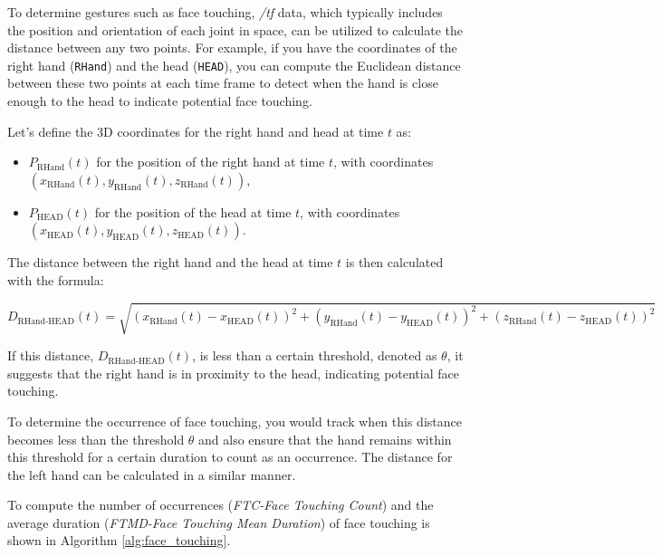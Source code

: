 To determine gestures such as face touching, \textit{/tf} data, which typically includes the position and orientation of each joint in space, can be utilized to calculate the distance between any two points. For example, if you have the coordinates of the right hand (\texttt{RHand}) and the head (\texttt{HEAD}), you can compute the Euclidean distance between these two points at each time frame to detect when the hand is close enough to the head to indicate potential face touching.

Let's define the 3D coordinates for the right hand and head at time $t$ as:
\begin{itemize}
\item $P_{\text{RHand}}(t)$ for the position of the right hand at time $t$, with coordinates $(x_{\text{RHand}}(t), y_{\text{RHand}}(t), z_{\text{RHand}}(t))$,
\item $P_{\text{HEAD}}(t)$ for the position of the head at time $t$, with coordinates $(x_{\text{HEAD}}(t), y_{\text{HEAD}}(t), z_{\text{HEAD}}(t))$.
\end{itemize}

The distance between the right hand and the head at time $t$ is then calculated with the formula:

\begin{equation}
D_{\text{RHand-HEAD}}(t) = \sqrt{(x_{\text{RHand}}(t) - x_{\text{HEAD}}(t))^2 + (y_{\text{RHand}}(t) - y_{\text{HEAD}}(t))^2 + (z_{\text{RHand}}(t) - z_{\text{HEAD}}(t))^2}
\end{equation}

If this distance, $D_{\text{RHand-HEAD}}(t)$, is less than a certain threshold, denoted as $\theta$, it suggests that the right hand is in proximity to the head, indicating potential face touching.

To determine the occurrence of face touching, you would track when this distance becomes less than the threshold $\theta$ and also ensure that the hand remains within this threshold for a certain duration to count as an occurrence. The distance for the left hand can be calculated in a similar manner.

To compute the number of occurrences (\textit{FTC-Face Touching Count}) and the average duration (\textit{FTMD-Face Touching Mean Duration}) of face touching is shown in Algorithm \ref{alg:face_touching}.

